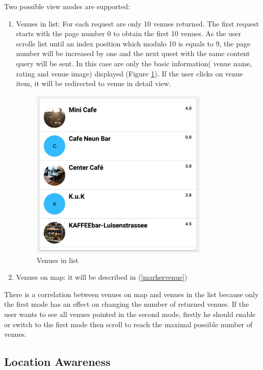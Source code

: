 Two possible view modes are supported:
 \begin{enumerate}
 	\item Venues in list: For each request are only 10 venues returned. The first request starts with the page number 0 to obtain the first 10 venues. As the user scrolls list until an index position which modulo 10 is equals to 9, the page number will be increased by one and the next quest with the same content query will be sent. In this case are only the basic information( venue name, rating and venue image) displayed (Figure \ref{fig:venuesInlist}). If the user clicks on venue item, it will be redirected to venue in detail view.
 	\begin{figure}[htbp]
 		\includegraphics[width=0.8\textwidth]{images/venuesonlist.jpg}
 		\centering
 		\caption[]{Venues in list}
 		\label{fig:venuesInlist}
 	\end{figure}
 	\item Venues on map: it will be described in (\ref{markervenue})
 \end{enumerate}
There is a correlation between venues on map and venues in the list because only the first mode has an effect on changing the number of returned venues. If the user wants to see all venues pointed in the second mode, firstly he should enable or switch to the first mode then scroll to reach the maximal possible number of venues.

\subsection{Location Awareness}

